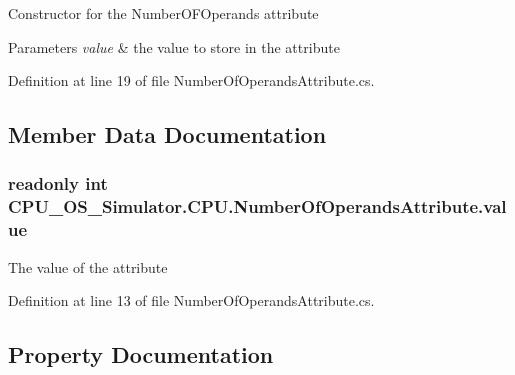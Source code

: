 Constructor for the Number\+O\+F\+Operands attribute 


\begin{DoxyParams}{Parameters}
{\em value} & the value to store in the attribute \\
\hline
\end{DoxyParams}


Definition at line 19 of file Number\+Of\+Operands\+Attribute.\+cs.



\subsection{Member Data Documentation}
\hypertarget{class_c_p_u___o_s___simulator_1_1_c_p_u_1_1_number_of_operands_attribute_a23e7e9d6f0e3af1c7deddce153d13965}{}
\subsubsection[{value}]{\setlength{\rightskip}{0pt plus 5cm}readonly int C\+P\+U\+\_\+\+O\+S\+\_\+\+Simulator.\+C\+P\+U.\+Number\+Of\+Operands\+Attribute.\+value\hspace{0.3cm}{\ttfamily [private]}}\label{class_c_p_u___o_s___simulator_1_1_c_p_u_1_1_number_of_operands_attribute_a23e7e9d6f0e3af1c7deddce153d13965}


The value of the attribute 



Definition at line 13 of file Number\+Of\+Operands\+Attribute.\+cs.



\subsection{Property Documentation}
\hypertarget{class_c_p_u___o_s___simulator_1_1_c_p_u_1_1_number_of_operands_attribute_a00873634b211bcf2fd8b1425aa5143d6}{}
